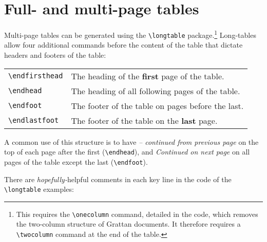 \section{Full- and multi-page tables}

Multi-page tables can be generated using the \texttt{\textbackslash longtable} package.\footnote{This requires the \texttt{\textbackslash onecolumn} command, detailed in the code, which removes the two-column structure of Grattan documents. It therefore requires a \texttt{\textbackslash twocolumn} command at the end of the table.} Long-tables allow four additional commands before the content of the table that dictate headers and footers of the table: 

\vspace{-10pt} %
    \begin{center}
    \begin{tabular}{l|l}  %
        \texttt{\textbackslash endfirsthead} & The heading of the \textbf{first} page of the table.  \\
        \texttt{\textbackslash endhead} & The heading of all following pages of the table. \\
        \texttt{\textbackslash endfoot} & The footer of the table on pages before the last.  \\
        \texttt{\textbackslash endlastfoot} & The footer of the table on the \textbf{last} page. \\
    \end{tabular}
    \end{center}
\vspace{-10pt} %

A common use of this structure is to have  \textit{\footnotesize -- continued from previous page} on the top of each page after the first (\texttt{\textbackslash endhead}), and \textit{\footnotesize Continued on next page} on all pages of the table except the last (\texttt{\textbackslash endfoot}). 

There are \textit{hopefully-}helpful comments in each key line in the code of the \texttt{\textbackslash longtable} examples:\\
\vspace{10pt} %


